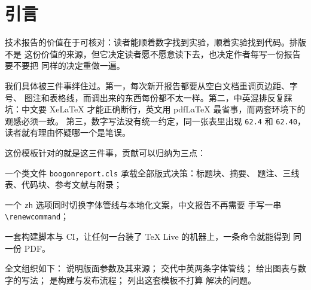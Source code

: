 \section{引言}
\label{sec:intro}

技术报告的价值在于可核对：读者能顺着数字找到实验，顺着实验找到代码。排版不是
这份价值的来源，但它决定读者愿不愿意读下去，也决定作者每写一份报告要不要把
同样的决定重做一遍。

我们具体被三件事绊住过。第一，每次新开报告都要从空白文档重调页边距、字号、
图注和表格线，而调出来的东西每份都不太一样。第二，中英混排反复踩坑：中文要
XeLaTeX 才能正确断行，英文用 pdfLaTeX 最省事，而两套环境下的观感必须一致。
第三，数字写法没有统一约定，同一张表里出现 \texttt{62.4} 和 \texttt{62.40}，
读者就有理由怀疑哪一个是笔误。

这份模板针对的就是这三件事，贡献可以归纳为三点：

\begin{contributions}
  \item 一个类文件 \texttt{boogonreport.cls} 承载全部版式决策：标题块、摘要、
        题注、三线表、代码块、参考文献与附录；
  \item 一个 \texttt{zh} 选项同时切换字体管线与本地化文案，中文报告不再需要
        手写一串 \verb|\renewcommand|；
  \item 一套构建脚本与 CI，让任何一台装了 TeX Live 的机器上，一条命令就能得到
        同一份 PDF。
\end{contributions}

全文组织如下： 说明版面参数及其来源；
交代中英两条字体管线； 给出图表与数字的写法；
 是构建与发布流程； 列出这套模板不打算
解决的问题。
